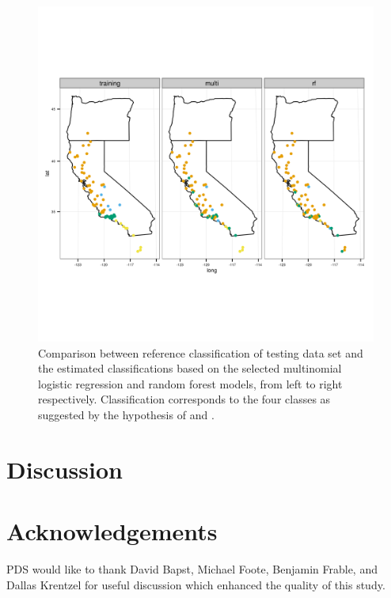 \documentclass[12pt]{article}\usepackage{graphicx, color}
\begin{document}
\begin{figure}[ht]
  \centering
  \includegraphics[width = \textwidth]{figure/gen_map}
  \caption{Comparison between reference classification of testing data set and the estimated classifications based on the selected multinomial logistic regression and random forest models, from left to right respectively. Classification corresponds to the four classes as suggested by the hypothesis of \citet{Spinks2005} and \citet{Spinks2010}.}
  \label{fig:gen_map}
\end{figure}

\section{Discussion}


\section*{Acknowledgements}
PDS would like to thank David Bapst, Michael Foote, Benjamin Frable, and Dallas Krentzel for useful discussion which enhanced the quality of this study.



\end{document}
